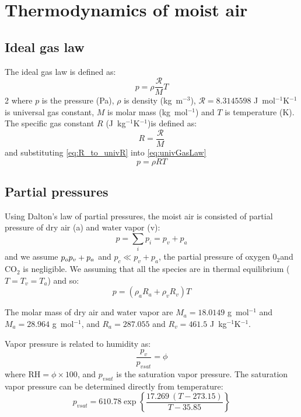 \chapter{Thermodynamics of moist air}
\label{app:thermodynamics}


\section*{Ideal gas law}

The ideal gas law is defined as:
\begin{equation}
p = \rho\frac{\mathcal{R}}{M}T
\label{eq:univGasLaw}
\end{equation}2
where $p$ is the pressure (Pa), $\rho$ is density (kg~m$^{-3}$), $\mathcal{R}=\num{8.3145598}$ J~mol$^{-1}$K$^{-1}$ is universal gas constant, $M$ is molar mass (kg~mol$^{-1}$) and $T$ is temperature (K). The specific gas constant $R$ (J~kg$^{-1}$K$^{-1}$)is defined as:
\begin{equation}
R = \frac{\mathcal{R}}{M}
\label{eq:R_to_univR}
\end{equation}
and substituting \ref{eq:R_to_univR} into \ref{eq:univGasLaw}
\begin{equation}
p = \rho R T
\label{eq:idealGasLaw}
\end{equation}

\section*{Partial pressures}

Using Dalton's law of partial pressures, the moist air is consisted of partial pressure of dry air (a) and water vapor (v):
\begin{equation}
p = \sum_i p_i  = p_v + p_a
\label{eq:dalton}
\end{equation}
and we assume $p_o\\ p_v+p_a$ and $p_c\ll p_v + p_a$, the partial pressure of oxygen 0$_2$and CO$_2$ is negligible. We assuming that all the species are in thermal equilibrium ($T = T_v = T_a$) and so:
\begin{equation}
p = \left(\rho_a R_a + \rho_v R_v \right) T
\end{equation}

The molar mass of dry air and water vapor are $M_a = \num{18.0149}$ g~mol$^{-1}$ and $M_a=\num{28.964}$ g~mol$^{-1}$, and $R_a = \num{287.055}$ and $R_v = \num{461.5}$ J~kg$^{-1}$K$^{-1}$.

Vapor pressure is related to humidity as:
\begin{equation}
\frac{p_v}{p_{\textit{vsat}}} = \phi
\end{equation}
where $\textrm{RH}=\phi\times 100$, and $p_{\textit{vsat}}$ is the saturation vapor pressure. The saturation vapor pressure can be determined directly from temperature:
\begin{equation}
p_{vsat} = 610.78 \exp \left\{\frac{17.269\ (T - 273.15)}{T - 35.85}\right\}
\end{equation}

